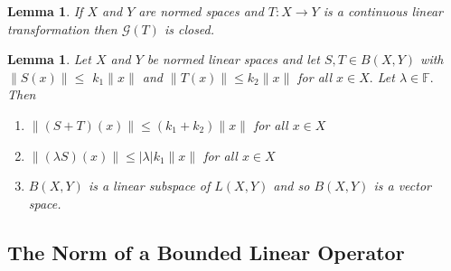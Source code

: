 \documentclass[10pt]{paper}
\newtheorem{lemma}[theorem]{Lemma}
\begin{document}
\begin{lemma}
    If $X$ and $Y$ are normed spaces and $T: X \rightarrow Y$ is a continuous linear transformation then $\mathcal{G}(T)$ is closed.
\end{lemma}

\begin{lemma}
    Let $X$ and $Y$ be normed linear spaces and let $S, T \in B(X, Y)$ with $\|S(x)\| \leq$ $k_{1}\|x\|$ and $\|T(x)\| \leq k_{2}\|x\|$ for all $x \in X .$ Let $\lambda \in \mathbb{F} .$ Then
    \begin{enumerate}
        \item $\|(S+T)(x)\| \leq\left(k_{1}+k_{2}\right)\|x\|$ for all $x \in X$
        \item $\|(\lambda S)(x)\| \leq|\lambda| k_{1}\|x\|$ for all $x \in X$
        \item $B(X, Y)$ is a linear subspace of $L(X, Y)$ and so $B(X, Y)$ is a vector space.
    \end{enumerate}
\end{lemma}

\subsection{The Norm of a Bounded Linear Operator}
\end{document}
